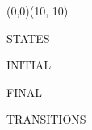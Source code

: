 \documentclass{report}
\begin{document}
\begin{VCPicture}{(0,0)(10, 10)}
  
  STATES
 
  INITIAL
  
  FINAL

  TRANSITIONS
  
\end{VCPicture}
\end{document}
